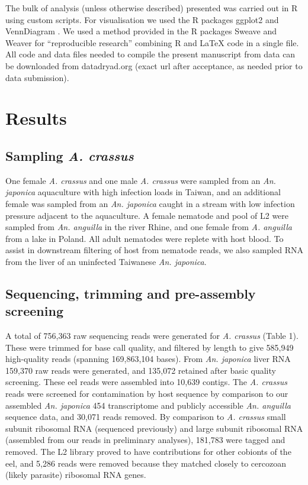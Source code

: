 \documentclass[10pt]{bmc_article}
\newenvironment{bmcformat}{\begin{raggedright}\baselineskip20pt\sloppy\setboolean{publ}{false}}{\end{raggedright}\baselineskip20pt\sloppy}
\begin{document}
\begin{bmcformat}
The bulk of analysis (unless otherwise described) presented was
carried out in R \cite{R_project} using custom scripts. For
visualisation we used the R packages ggplot2 \cite{ggplot-book} and
VennDiagram \cite{pmid21269502}. We used a method provided in the
R packages Sweave \cite{lmucs-papers:Leisch:2002} and Weaver
\cite{weaver} for ``reproducible research'' combining R and \LaTeX
code in a single file. All code and data files needed to compile the
present manuscript from data can be downloaded from datadryad.org
(exact url after acceptance, as needed prior to data submission).

\section*{Results}


\subsection*{Sampling \textit{A. crassus}}


One female \textit{A. crassus} and one male \textit{A. crassus} were
sampled from an \textit{An. japonica} aquaculture with high infection
loads in Taiwan, and an additional female was sampled from an
\textit{An. japonica} caught in a stream with low infection pressure
adjacent to the aquaculture. A female nematode and pool of L2 were
sampled from \textit{An. anguilla} in the river Rhine, and one female
from \textit{A. anguilla} from a lake in Poland. All adult nematodes
were replete with host blood. To assist in downstream filtering of
host from nematode reads, we also sampled RNA from the liver of an
uninfected Taiwanese \textit{An. japonica}.

 \subsection*{Sequencing, trimming and pre-assembly screening}







A total of 756,363 raw sequencing reads
were generated for \textit{A. crassus} (Table 1). These were trimmed
for base call quality, and filtered by length to give
585,949 high-quality reads (spanning
169,863,104 bases). From \textit{An. japonica}
liver RNA 159,370 raw reads were generated, and
135,072 retained after basic quality
screening. These eel reads were assembled into
10,639 contigs. The \textit{A. crassus} reads
were screened for contamination by host sequence by comparison to our
assembled \textit{An. japonica} 454 transcriptome and publicly
accessible \textit{An. anguilla} sequence data, and
30,071 reads removed. By comparison
to \textit{A. crassus} small subunit ribosomal RNA (sequenced
previously) and large subunit ribosomal RNA (assembled from our reads
in preliminary analyses), 181,783
were tagged and removed. The L2 library proved to have contributions
for other cobionts of the eel, and
5,286 reads were removed
because they matched closely to cercozoan (likely parasite) ribosomal
RNA genes.


\end{bmcformat}
\end{document}
